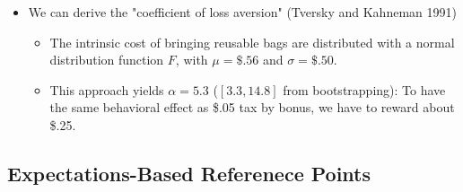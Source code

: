 \documentclass[../root]{subfiles}
\begin{document}
    \begin{itemize}
      \item We can derive the "coefficient of loss aversion" (Tversky and Kahneman 1991)
      \begin{itemize}
        \item The intrinsic cost of bringing reusable bags are distributed with a normal distribution function $F$, with $\mu = \$.56$ and $\sigma = \$.50$.
        \item This approach yields $\alpha = 5.3$ ($[3.3, 14.8]$ from bootstrapping): To have the same behavioral effect as \$.05 tax by bonus, we have to reward about  \$.25.
      \end{itemize}
    \end{itemize}

    \subsection{Expectations-Based Referenece Points}
\end{document}
